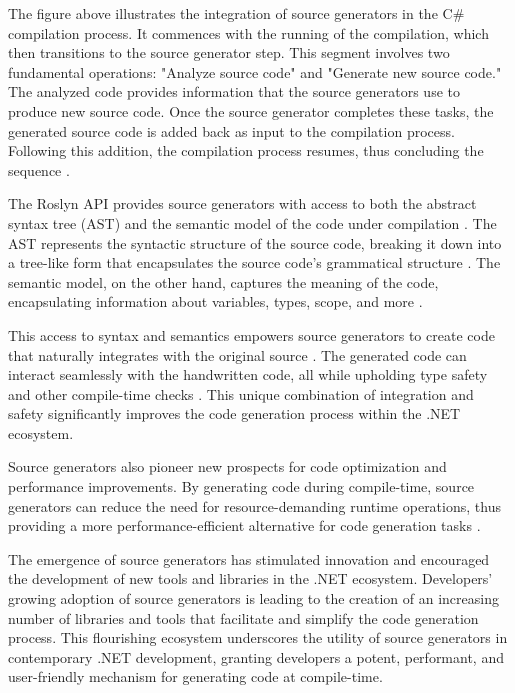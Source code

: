 The figure above illustrates the integration of source generators in the C\# compilation process. It commences with the running of the compilation, which then transitions to the source generator step. This segment involves two fundamental operations: "Analyze source code" and "Generate new source code." The analyzed code provides information that the source generators use to produce new source code. Once the source generator completes these tasks, the generated source code is added back as input to the compilation process. Following this addition, the compilation process resumes, thus concluding the sequence \cite{CSharpRoslyn}.

The Roslyn API provides source generators with access to both the abstract syntax tree (AST) and the semantic model of the code under compilation \cite{CSharpRoslyn}. The AST represents the syntactic structure of the source code, breaking it down into a tree-like form that encapsulates the source code's grammatical structure \cite{CSharpRoslyn}. The semantic model, on the other hand, captures the meaning of the code, encapsulating information about variables, types, scope, and more \cite{CSharpRoslyn}.

This access to syntax and semantics empowers source generators to create code that naturally integrates with the original source \cite{CSharpRoslyn}. The generated code can interact seamlessly with the handwritten code, all while upholding type safety and other compile-time checks \cite{Carter2020}. This unique combination of integration and safety significantly improves the code generation process within the .NET ecosystem.

Source generators also pioneer new prospects for code optimization and performance improvements. By generating code during compile-time, source generators can reduce the need for resource-demanding runtime operations, thus providing a more performance-efficient alternative for code generation tasks \cite{CSharpRoslyn}.

The emergence of source generators has stimulated innovation and encouraged the development of new tools and libraries in the .NET ecosystem. Developers' growing adoption of source generators is leading to the creation of an increasing number of libraries and tools that facilitate and simplify the code generation process. This flourishing ecosystem underscores the utility of source generators in contemporary .NET development, granting developers a potent, performant, and user-friendly mechanism for generating code at compile-time.

